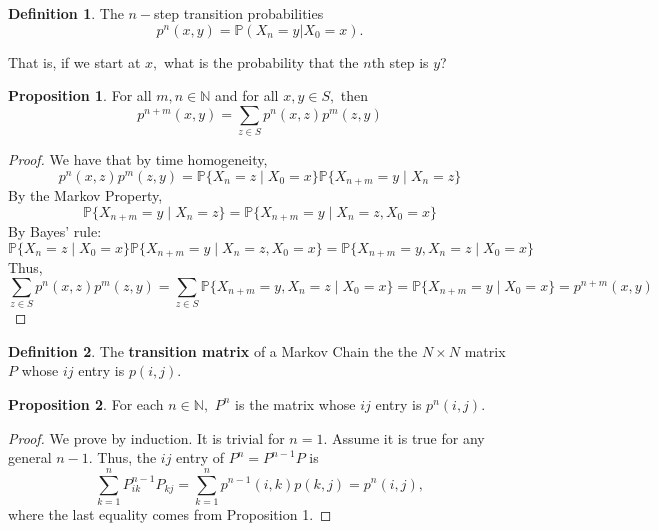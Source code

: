 \documentclass[10pt, oneside]{article}
\newcommand{\bbP}{\mathbb{P}}
\newcommand{\bbN}{\mathbb{N}}
\theoremstyle{definition}
\newtheorem{defn}{Definition}
\newtheorem{prop}{Proposition}
\begin{document}
\begin{defn}
    The $n-$step transition probabilities 
    \[p^n(x,y) = \bbP(X_n = y | X_0 = x).\]
\end{defn}
That is, if we start at $x,$ what is the probability that the $n$th step is $y$?
\begin{prop}
    For all $m,n \in \bbN$ and for all $x,y \in S,$ then 
    \[p^{n + m}(x,y) = \sum_{z\in S}p^n(x,z)p^m(z,y)\]
\end{prop}
\begin{proof}
    We have that by time homogeneity, 
    \[p^n(x,z)p^m(z,y) = \bbP\{X_n = z \mid X_0 = x\} \bbP\{X_{n + m} = y \mid X_n = z\}\] By the Markov Property,
    \[\bbP\{X_{n + m} = y \mid X_n = z\} = \bbP\{X_{n + m} = y \mid X_n = z, X_0 = x\}\] By Bayes' rule:
    \[\bbP\{X_n = z \mid X_0 = x\}\bbP\{X_{n + m} = y \mid X_n = z, X_0 = x\} = \bbP\{X_{n +m} = y, X_n = z \mid X_0 = x\}\] Thus, 
    \[\sum_{z \in S}p^n(x,z)p^m(z,y) = \sum_{z\in S}\bbP\{X_{n +m} = y, X_n = z \mid X_0 = x\} = \bbP\{X_{n + m} = y \mid X_0 = x\} = p^{n + m}(x,y)\]
\end{proof}
\begin{defn}
    The \textbf{transition matrix} of a Markov Chain the the $N \times N$ matrix $P$ whose $ij$ entry is $p(i,j).$
\end{defn}
\begin{prop}
    For each $n \in \bbN,$ $P^n$ is the matrix whose $ij$ entry is $p^n(i,j).$
\end{prop}
\begin{proof}
    We prove by induction. It is trivial for $n = 1.$ Assume it is true for any general $n-1.$ Thus, the $ij$ entry of $P^n = P^{n-1}P$ is \[\sum_{k=1}^n P^{n-1}_{ik}P_{kj} = \sum_{k=1}^n p^{n-1}(i,k)p(k,j) = p^n(i,j),\] where the last equality comes from Proposition 1.
\end{proof}

\newpage
\end{document}
